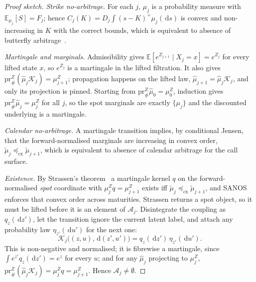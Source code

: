 \documentclass[11pt]{article}
\newcommand{\E}{\mathbb{E}}
\newcommand{\cK}{\mathcal{K}}
\newcommand{\cA}{\mathcal{A}}
\providecommand{\pr}{\mathrm{pr}}
\providecommand{\1}{\mathbf 1}
\newcommand{\cxle}{\preceq_{\mathrm{cx}}}
\newcommand{\dd}{\,\mathrm{d}}
\begin{document}
\begin{proof}[Proof sketch]
\emph{Strike no-arbitrage.} For each $j$, $\mu_j$ is a probability measure with
$\E_{\mu_j}[S]=F_j$; hence $C_j(K)=D_j\int(s-K)^+\mu_j(\dd s)$ is convex and
non-increasing in $K$ with the correct bounds, which is equivalent to absence of
butterfly arbitrage~\cite{breeden1978}.

\emph{Martingale and marginals.} Admissibility gives $\E[e^{Z_{j+1}}\mid X_j=x]=e^{Z_j}$ for
every lifted state $x$, so $e^{Z_j}$ is a martingale in the lifted filtration. It also gives
$\pr^Z_{\#}(\widehat\mu_j\cK_j)=\mu^Z_{j+1}$; propagation happens on the lifted law,
$\widehat\mu_{j+1}=\widehat\mu_j\cK_j$, and only its projection is pinned. Starting from
$\pr^Z_{\#}\widehat\mu_0=\mu^Z_0$, induction gives $\pr^Z_{\#}\widehat\mu_j=\mu^Z_j$ for all $j$,
so the spot marginals are exactly $\{\mu_j\}$ and the discounted underlying is a martingale.

\emph{Calendar no-arbitrage.} A martingale transition implies, by conditional Jensen,
that the forward-normalised marginals are increasing in convex order,
$\tilde\mu_j\cxle\tilde\mu_{j+1}$, which is equivalent to absence of calendar
arbitrage for the call surface.

\emph{Existence.} By Strassen's theorem~\cite{strassen1965,beiglbock2013} a martingale kernel $q$
on the forward-normalised \emph{spot} coordinate with $\mu^Z_j q=\mu^Z_{j+1}$ exists iff
$\tilde\mu_j\cxle\tilde\mu_{j+1}$, and SANOS enforces that convex order across maturities. Strassen
returns a spot object, so it must be lifted before it is an element of $\cA_j$. Disintegrate the
coupling as $q_z(\dd z')$, let the transition ignore the current latent label, and attach any
probability law $\eta_{z'}(\dd u')$ for the next one:
\begin{equation}
  \cK_j\bigl((z,u),\dd(z',u')\bigr)=q_z(\dd z')\,\eta_{z'}(\dd u').
  \label{eq:strassen-lift}
\end{equation}
This is non-negative and normalised; it is fibrewise a martingale, since
$\int e^{z'}q_z(\dd z')=e^{z}$ for every $u$; and for any $\widehat\mu_j$ projecting to $\mu^Z_j$,
$\pr^Z_{\#}(\widehat\mu_j\cK_j)=\mu^Z_j q=\mu^Z_{j+1}$. Hence $\cA_j\neq\emptyset$.
\end{proof}
\end{document}
